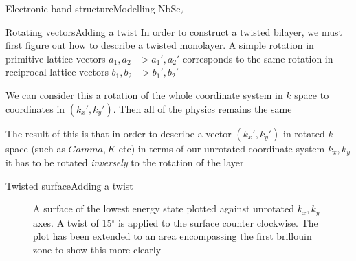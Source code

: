 \documentclass[9pt]{beamer}
\begin{document}
\begin{frame}{Electronic band structure}{Modelling NbSe$_2$}
\begin{figure}
\begin{minipage}{.5\textwidth}
  \end{minipage}
  \end{figure}
\end{frame}

\begin{frame}{Rotating vectors}{Adding a twist}
  In order to construct a twisted bilayer, we must first figure out how to describe a twisted monolayer. A simple rotation in primitive lattice vectors $a_1, a_2 -> a_1', a_2'$ corresponds to the same rotation in reciprocal lattice vectors $b_1, b_2 -> b_1', b_2'$

  We can consider this a rotation of the whole coordinate system in $k$ space to coordinates in $(k_x', k_y')$. Then all of the physics remains the same

  The result of this is that in order to describe a vector $(k_x', k_y')$ in rotated $k$ space (such as $Gamma, K$ etc) in terms of our unrotated coordinate system $k_x, k_y$ it has to be rotated \textit{inversely} to the rotation of the layer
\end{frame}

\begin{frame}{Twisted surface}{Adding a twist}
  \begin{figure}
    \centering
    \caption{A surface of the lowest energy state plotted against unrotated $k_x, k_y$ axes. A twist of 15$^\circ$ is applied to the surface counter clockwise. The plot has been extended to an area encompassing the first brillouin zone to show this more clearly}
  \end{figure}
\end{frame}
\end{document}
